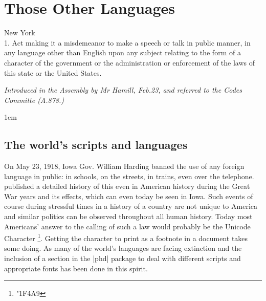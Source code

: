 \newfontfamily{}
\makeatletter
\@specialfalse
\makeatother




\chapter{Those Other Languages}

\epigraph{New York\\
          1. Act making it a misdemeanor to make a speech or talk in public manner, in any language other
than English upon any subject relating to the form of a character of the government or the administration or enforcement of the laws of this state or the United States. }{\itshape Introduced in the Assembly by Mr Hamill, Feb.23, and referred to the Codes Committe (A.878.)}

\parindent1em



\section{The world's scripts and languages}


On May 23, 1918, Iowa Gov. William Harding banned the use of any foreign language in public: in schools, on the streets, in trains, even over the telephone.   \cite{frese} published a detailed history of this even in American history during the Great War years and its effects, which can even today be seen in Iowa. Such events of course during stressful times in a history of a country are not unique to America and similar politics can be observed throughout all human history. Today most Americans' answer to the calling of such a law would probably be the Unicode Character \footnote{\protect\emoji\protect\char"1F4A9}. Getting the character to print as a footnote in a document takes some doing. As many of the world's languages are facing extinction and the inclusion of a section in the |phd| package to deal with different scripts and appropriate fonts has been done in this spirit.

